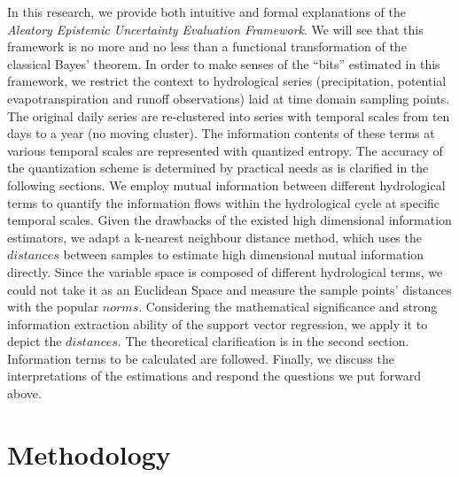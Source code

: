 \documentclass[draft,wrr]{AGUTeX}
\begin{document}
\begin{article}
In this research, we provide both intuitive and formal explanations of the \emph{Aleatory Epistemic Uncertainty Evaluation Framework}. We will see that this framework is no more and no less than a  functional transformation of the classical Bayes' theorem. In order to make senses of the ``bits'' estimated in this framework, we restrict the context to hydrological series (precipitation, potential evapotranspiration and runoff observations) laid at time domain sampling points. The original daily series are re-clustered into series with temporal scales from ten days to a year (no moving cluster). The information contents of these terms at various temporal scales are represented with quantized entropy. The accuracy of the quantization scheme is determined by practical needs as is clarified in the following sections. We employ mutual information between different hydrological terms to quantify the information flows within the hydrological cycle at specific temporal scales. Given the drawbacks of the existed high dimensional information estimators, we adapt a k-nearest neighbour distance method\citep{kraskov2004estimating}, which uses the $distances$ between samples to estimate high dimensional mutual information directly. Since the variable space is composed of different hydrological terms, we could not take it as an Euclidean Space and measure the sample points' distances with the popular $norms$. Considering the mathematical significance and strong information extraction ability of the support vector regression\citep{cortes1995support}, we apply it to depict the $distances$. The theoretical clarification is in the second section. Information terms to be calculated are followed. Finally, we discuss the interpretations of the estimations and respond the questions we put forward above.





\section{Methodology}

\end{article}
\end{document}
